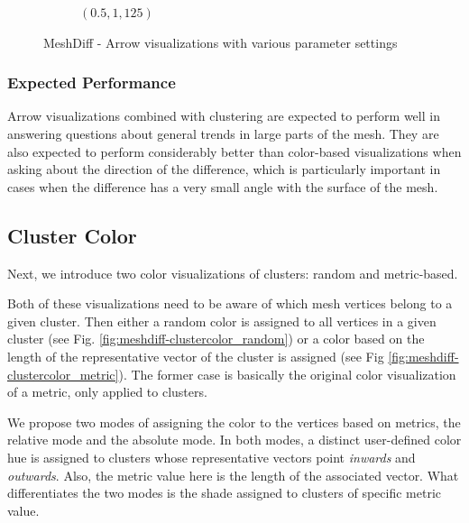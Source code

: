 \begin{figure}[h]
\begin{subfigure}{0.4\textwidth}
    \caption{\((0.5,1,125)\)}
    \label{fig:meshdiff-arrows_1-125}
	\end{subfigure}
\caption[MeshDiff - Arrow visualizations with various parameter settings]{MeshDiff - Arrow visualizations with various parameter settings\footnotemark}
\label{fig:meshdiff-arrows}
\end{figure}


\subsubsection{Expected Performance}

Arrow visualizations combined with clustering are expected to perform well in answering questions about general trends in large parts of the mesh. They are also expected to perform considerably better than color-based visualizations when asking about the direction of the difference, which is particularly important in cases when the difference has a very small angle with the surface of the mesh.
\subsection{Cluster Color}
\label{subsec:analysis-visualizations-cluster_color}

Next, we introduce two color visualizations of clusters: random and metric-based.

Both of these visualizations need to be aware of which mesh vertices belong to a given cluster. Then either a random color is assigned to all vertices in a given cluster (see Fig. \ref{fig:meshdiff-clustercolor_random}) or a color based on the length of the representative vector of the cluster is assigned (see Fig \ref{fig:meshdiff-clustercolor_metric}). The former case is basically the original color visualization of a metric, only applied to clusters.

We propose two modes of assigning the color to the vertices based on metrics, the relative mode and the absolute mode. In both modes, a distinct user-defined color hue is assigned to clusters whose representative vectors point {\it inwards} and {\it outwards}. Also, the metric value here is the length of the associated vector. What differentiates the two modes is the shade assigned to clusters of specific metric value.

